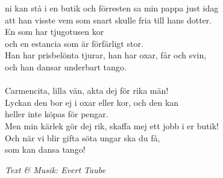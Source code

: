 ni kan stå i en butik och förresten sa min pappa just idag\\
att han visste vem som snart skulle fria till hans dotter.\\
En som har tjugotusen kor\\
och en estancia som är förfärligt stor.\\
Han har prisbelönta tjurar, han har oxar, får och svin,\\
och han dansar underbart tango.\\
\\
Carmencita, lilla vän, akta dej för rika män!\\
Lyckan den bor ej i oxar eller kor, och den kan\\
heller inte köpas för pengar.\\
Men min kärlek gör dej rik, skaffa mej ett jobb i er butik!\\
Och när vi blir gifta söta ungar ska du få,\\
som kan dansa tango!
\par
\vspace{10pt}
{\footnotesize\textit{Text \& Musik: Evert Taube}}
